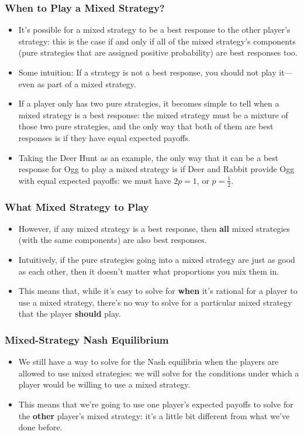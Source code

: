 \begin{frame}
\frametitle{When to Play a Mixed Strategy?}
\begin{itemize}
	\item It's possible for a mixed strategy to be a best response to the other player's strategy: this is the case if and only if all of the mixed strategy's \alert{components} (pure strategies that are assigned positive probability) are best responses too.
	\item Some intuition: If a strategy is not a best response, you should not play it---even as part of a mixed strategy.
	\item If a player only has two pure strategies, it becomes simple to tell when a mixed strategy is a best response: the mixed strategy must be a mixture of those two pure strategies, and the only way that both of them are best responses is if they have equal expected payoffs.
	\item Taking the Deer Hunt as an example, the only way that it can be a best response for Ogg to play a mixed strategy is if Deer and Rabbit provide Ogg with equal expected payoffs: we must have $2p = 1$, or $p = \frac{1}{2}$.
\end{itemize}
\end{frame}

\begin{frame}
\frametitle{What Mixed Strategy to Play}
\begin{itemize}
	\item However, if any mixed strategy is a best response, then \textbf{all} mixed strategies (with the same components) are also best responses.
	\item Intuitively, if the pure strategies going into a mixed strategy are just as good as each other, then it doesn't matter what proportions you mix them in.
	\item This means that, while it's easy to solve for \textbf{when} it's rational for a player to use a mixed strategy, there's no way to solve for a particular mixed strategy that the player \textbf{should} play.
\end{itemize}
\end{frame}

\begin{frame}
\frametitle{Mixed-Strategy Nash Equilibrium}
\begin{itemize}
	\item We still have a way to solve for the Nash equilibria when the players are allowed to use mixed strategies: we will solve for the conditions under which a player would be willing to use a mixed strategy.
	\item This means that we're going to use one player's expected payoffs to solve for the \textbf{other} player's mixed strategy: it's a little bit different from what we've done before.
\end{itemize}
\end{frame}

